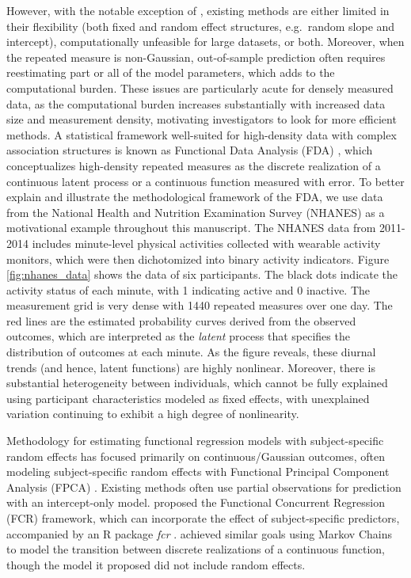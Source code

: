 \documentclass[12pt]{article}
\begin{document}
However, with
the notable exception of \citet{leroux2016}, existing methods are either 
limited in their flexibility (both fixed and random effect structures,
e.g.~random slope and intercept), computationally unfeasible for large
datasets, or both. Moreover, when the repeated measure is non-Gaussian, out-of-sample prediction often requires reestimating part or all of the model parameters, which adds to the computational burden. These issues are particularly acute for densely measured data, as the computational burden increases substantially with increased data size and measurement density, motivating investigators to look for more efficient methods. A statistical framework well-suited for high-density data with complex association structures is known as Functional Data Analysis (FDA) \citep{fdaR2024, fda2005}, which conceptualizes high-density repeated measures as the discrete realization of a continuous latent process or a continuous function measured with error. To better explain and illustrate the methodological framework of the FDA, we use data from the National Health and Nutrition Examination Survey (NHANES) as a motivational example throughout this manuscript. The NHANES data from 2011-2014 includes minute-level physical activities collected with wearable activity monitors, which were then dichotomized into binary activity indicators. Figure \ref{fig:nhanes_data} shows the data of six participants. The black dots indicate the activity status of each minute, with 1 indicating active and 0 inactive. The measurement grid is very dense with 1440 repeated measures over one day. The red lines are the estimated probability curves derived from the observed outcomes, which are interpreted as the \textit{latent} process that specifies the distribution of outcomes at each minute. As the figure reveals, these diurnal trends (and hence, latent functions) are highly nonlinear. Moreover, there is substantial heterogeneity between individuals, which cannot be fully explained using participant characteristics modeled as fixed effects, with unexplained variation continuing to exhibit a high degree of nonlinearity.


Methodology for estimating functional regression models with subject-specific random effects has focused primarily on continuous/Gaussian outcomes, often modeling
subject-specific random effects with Functional Principal Component Analysis (FPCA) \citep{chiou2012, goldberg2014, shang2017, kraus2015}. Existing methods often use partial observations for prediction with an intercept-only model.
\citet{leroux2016} proposed
the Functional Concurrent Regression (FCR) framework, which can incorporate
the effect of subject-specific predictors, accompanied by an R package \emph{fcr} \citep{fcrpkg}. \citet{delaigo2016} achieved
similar goals using Markov Chains to model the transition between discrete realizations of a continuous function, though the model it proposed did not include random effects.
\end{document}
